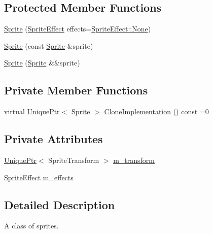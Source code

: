 \subsection*{Protected Member Functions}
\begin{DoxyCompactItemize}
\item 
\hyperlink{classmage_1_1_sprite_a4e7926b7fd1455afcb95e45f25b83246}{Sprite} (\hyperlink{namespacemage_a9cfe18123066ba4236f548f9de75d881}{Sprite\+Effect} effects=\hyperlink{namespacemage_a9cfe18123066ba4236f548f9de75d881a6adf97f83acf6453d4a6a4b1070f3754}{Sprite\+Effect\+::\+None})
\item 
\hyperlink{classmage_1_1_sprite_a9c1eb4f5a85e1fa17479012dd22114a9}{Sprite} (const \hyperlink{classmage_1_1_sprite}{Sprite} \&sprite)
\item 
\hyperlink{classmage_1_1_sprite_a84d01e440d0a8105d45a3e18a0698d07}{Sprite} (\hyperlink{classmage_1_1_sprite}{Sprite} \&\&sprite)
\end{DoxyCompactItemize}
\subsection*{Private Member Functions}
\begin{DoxyCompactItemize}
\item 
virtual \hyperlink{namespacemage_a3316d7143a973e37adf1110f2e80ca31}{Unique\+Ptr}$<$ \hyperlink{classmage_1_1_sprite}{Sprite} $>$ \hyperlink{classmage_1_1_sprite_a214890d7da493bccadb2327b8c7ffb09}{Clone\+Implementation} () const =0
\end{DoxyCompactItemize}
\subsection*{Private Attributes}
\begin{DoxyCompactItemize}
\item 
\hyperlink{namespacemage_a3316d7143a973e37adf1110f2e80ca31}{Unique\+Ptr}$<$ Sprite\+Transform $>$ \hyperlink{classmage_1_1_sprite_ae9907dd9d43fe2ce025bbc86b06dc7a3}{m\+\_\+transform}
\item 
\hyperlink{namespacemage_a9cfe18123066ba4236f548f9de75d881}{Sprite\+Effect} \hyperlink{classmage_1_1_sprite_a87a51b2b131c28bad75768d14defa3c1}{m\+\_\+effects}
\end{DoxyCompactItemize}


\subsection{Detailed Description}
A class of sprites. 

